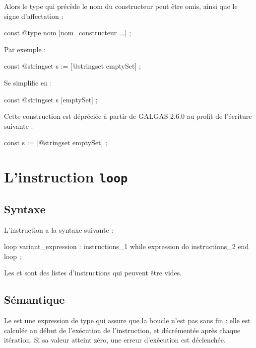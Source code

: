 Alors le type qui précède le nom du constructeur peut être omis, ainsi que le signe d'affectation :
\begin{galgascode}
const @type nom [nom_constructeur ...] ;
\end{galgascode}

Par exemple :
\begin{galgascode}
const @stringset s := [@stringset emptySet] ;
\end{galgascode}

Se simplifie en :

\begin{galgascode}
const @stringset s [emptySet] ;
\end{galgascode}

Cette construction est dépréciée à partir de GALGAS 2.6.0 au profit de l'écriture suivante :
\begin{galgascode}
const s := [@stringset emptySet] ;
\end{galgascode}






\section{L'instruction \texttt{loop}}


\subsection{Syntaxe}

L'instruction  a la syntaxe suivante :
\begin{galgascode}
loop variant_expression :
  instructions_1
while expression do
  instructions_2
end loop ;  
\end{galgascode}


Les  et  sont des listes d'instructions qui peuvent être vides.

\subsection{Sémantique}

Le  est une expression de type  qui assure que la boucle n'est pas sans fin : elle est calculée au début de l'exécution de l'instruction, et décrémentée après chaque itération. Si sa valeur atteint zéro, une erreur d'exécution est déclenchée.

